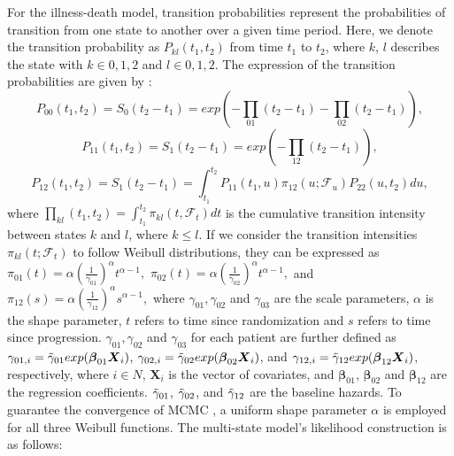 For the illness-death model, transition probabilities represent the probabilities of transition from one state to another over a given time period. Here, we denote the transition probability as $P_{kl}(t_1, t_2)$ from time $t_1$ to $t_2$, where $k$, $l$ describes the state with $k \in {0, 1, 2}$ and $l \in {0, 1, 2}$. The expression of the transition probabilities are given by \citep{meira2009multi}:
$$P_{00}(t_1, t_2) = S_0(t_2 - t_1) = exp{(-\prod_{01}(t_2 - t_1) - \prod_{02}(t_2 - t_1))},$$
$$P_{11}(t_1, t_2) = S_1(t_2 - t_1) = exp{(-\prod_{12}(t_2 - t_1))},$$
$$P_{12}(t_1, t_2) = S_1(t_2 - t_1) = \int_{t_1}^{t_2}P_{11}(t_1, u) \pi_{12}(u;\mathcal{F}_u)P_{22}(u, t_2)du,$$
where $\prod_{kl}(t_1, t_2)=\int_{t_1}^{t_2}\pi_{kl}(t, \mathcal{F}_t)dt$ is the cumulative transition intensity between states $k$ and $l$, where $k \leq l$. If we consider the transition intensities $\pi_{kl}(t; \mathcal{F}_t)$ to follow Weibull distributions, they can be expressed as
$\pi_{01}(t)=\alpha\left(\frac{1}{\gamma_{01}}\right)^\alpha t^{\alpha - 1},$
$\pi_{02}(t)=\alpha\left(\frac{1}{\gamma_{02}}\right)^\alpha t^{\alpha - 1},$
and $\pi_{12}(s)=\alpha\left(\frac{1}{\gamma_{12}}\right)^\alpha s^{\alpha - 1},$
where $\gamma_{01}, \gamma_{02}$ and $\gamma_{03}$ are the scale parameters, $\alpha$ is the shape parameter, $t$ refers to time since randomization and $s$ refers to time since progression. $\gamma_{01}, \gamma_{02}$ and $\gamma_{03}$ for each patient are further defined as $\gamma_{01,i} = \Tilde{\gamma}_{01}exp(\boldsymbol{\beta}_{01}\boldsymbol{X}_i)$, $\gamma_{02,i} = \Tilde{\gamma}_{02}exp(\boldsymbol{\beta}_{02}\boldsymbol{X}_i)$, and $\gamma_{12,i} = \Tilde{\gamma}_{12}exp(\boldsymbol{\beta}_{12}\boldsymbol{X}_i)$, respectively, where $i \in N$, $\boldsymbol{X}_i$ is the vector of covariates, and $\boldsymbol{\beta}_{01}$, $\boldsymbol{\beta}_{02}$ and $\boldsymbol{\beta}_{12}$ are the regression coefficients. $\Tilde{\gamma}_{01}$, $\Tilde{\gamma}_{02}$, and $\Tilde{\gamma}_{12}$ are the baseline hazards. To guarantee the convergence of \ac{MCMC} , a uniform shape parameter $\alpha$ is employed for all three Weibull functions. The multi-state model's likelihood construction is as follows:

